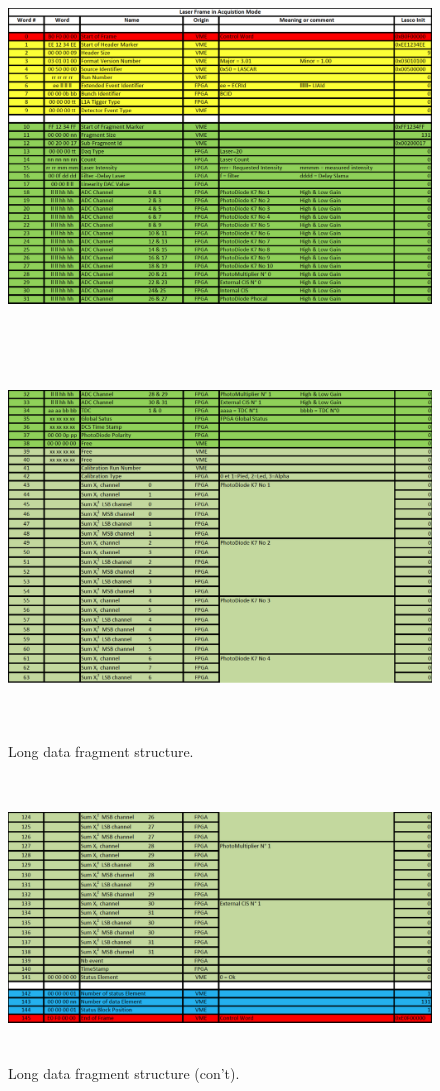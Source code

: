 \begin{figure}[htbp]
\centering
\includegraphics[height=10cm]{figures/long_fragment_1.pdf}
\includegraphics[height=9.9cm]{figures/long_fragment_2.pdf}
\caption{Long data fragment structure.}\label{fig:longfraga}
\end{figure}

\begin{figure}[htbp]
\centering
\includegraphics[height=7.5cm]{figures/long_fragment_3.pdf}
\caption{Long data fragment structure (con't).}\label{fig:longfragb}
\end{figure}

